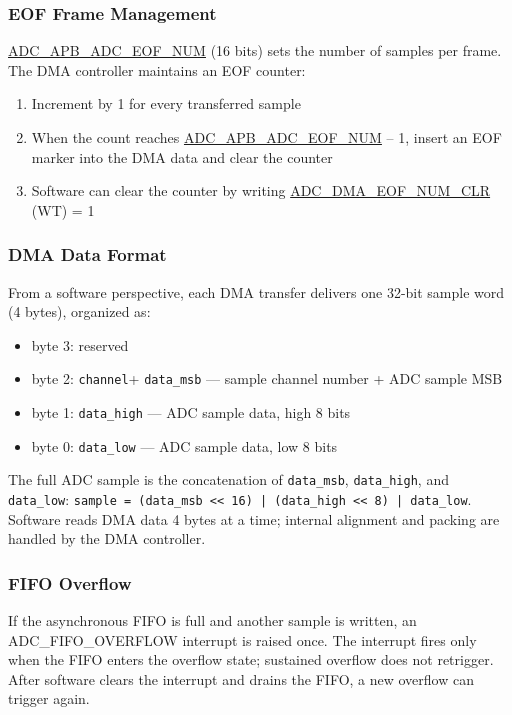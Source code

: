 \documentclass[main\_\_EN.tex]{subfiles}
\begin{document}
\subsubsection{EOF Frame Management}
\hyperref[fielddesc:ADCAPBADCEOFNUM]{ADC\_APB\_ADC\_EOF\_NUM} (16 bits) sets the number of samples per frame. The DMA controller maintains an EOF counter:
\begin{enumerate}
    \item Increment by 1 for every transferred sample
    \item When the count reaches \hyperref[fielddesc:ADCAPBADCEOFNUM]{ADC\_APB\_ADC\_EOF\_NUM} – 1, insert an EOF marker into the DMA data and clear the counter
    \item Software can clear the counter by writing \hyperref[fielddesc:ADCDMAEOFNUMCLR]{ADC\_DMA\_EOF\_NUM\_CLR} (WT) = 1
\end{enumerate}

\subsubsection{DMA Data Format}
From a software perspective, each DMA transfer delivers one 32-bit sample word (4 bytes), organized as:
\begin{itemize}
    \item byte 3: reserved
    \item byte 2: \verb+channel++ \verb+data_msb+ --- sample channel number + ADC sample MSB
    \item byte 1: \verb+data_high+ --- ADC sample data, high 8 bits
    \item byte 0: \verb+data_low+ --- ADC sample data, low 8 bits
\end{itemize}
The full ADC sample is the concatenation of \verb+data_msb+, \verb+data_high+, and \verb+data_low+: \verb+sample = (data_msb << 16) | (data_high << 8) | data_low+. Software reads DMA data 4 bytes at a time; internal alignment and packing are handled by the DMA controller.

\subsubsection{FIFO Overflow}
If the asynchronous FIFO is full and another sample is written, an ADC\_FIFO\_OVERFLOW interrupt is raised once. The interrupt fires only when the FIFO enters the overflow state; sustained overflow does not retrigger. After software clears the interrupt and drains the FIFO, a new overflow can trigger again.
\end{document}
